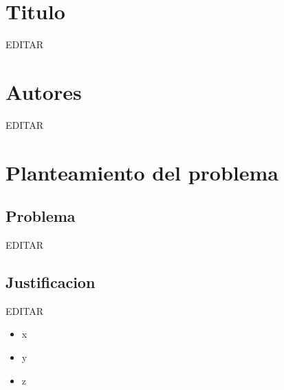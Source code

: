 \documentclass[preprint,12pt]{elsarticle}
\begin{document}
\section{Titulo}

EDITAR\\



\section{Autores}

EDITAR\\



\section{Planteamiento del problema}


\subsection {\textbf{Problema}}

EDITAR\\


\subsection {\textbf{Justificacion}}

EDITAR\\

\cite{Gartner} 

\begin{itemize}
	\item x
	\item y
	\item z
\end{itemize}
\end{document}
